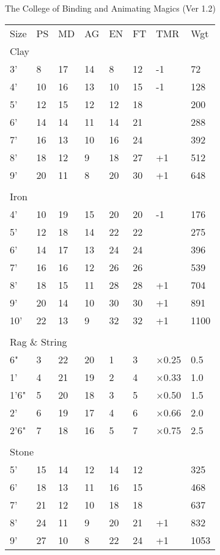 \begin{Chapter}{The College of Binding and Animating Magics (Ver 1.2)}
\begin{small}
\begin{tabularx}{\columnwidth}{llllllll}
Size	& PS	& MD	& AG	& EN	& FT	& TMR	& Wgt \\
\multicolumn{8}{l}{Clay} \\
3’	& 8	& 17	& 14	& 8	& 12	& -1	& 72 \\
4’	& 10	& 16	& 13	& 10	& 15	& -1	& 128 \\
5’	& 12	& 15	& 12	& 12	& 18	& 	& 200 \\
6’	& 14	& 14	& 11	& 14	& 21	& 	& 288 \\
7’	& 16	& 13	& 10	& 16	& 24	& 	& 392 \\
8’	& 18	& 12	& 9	& 18	& 27	& +1	& 512 \\
9’	& 20	& 11	& 8	& 20	& 30	& +1	& 648 \\
 	& 	& 	& 	& 	& 	& 	& \\
\multicolumn{8}{l}{Iron} \\
4’ 	& 10	& 19	& 15	& 20	& 20	& -1	& 176 \\
5’ 	& 12	& 18	& 14	& 22	& 22	& 	& 275 \\
6’ 	& 14	& 17	& 13	& 24	& 24	& 	& 396 \\
7’ 	& 16	& 16	& 12	& 26	& 26	& 	& 539 \\
8’ 	& 18	& 15	& 11	& 28	& 28	& +1	& 704 \\
9’ 	& 20	& 14	& 10	& 30	& 30	& +1	& 891 \\
10’ 	& 22	& 13	& 9	& 32	& 32	& +1	& 1100 \\
 	& 	& 	& 	& 	& 	& 	& \\
\multicolumn{8}{l}{Rag \& String} \\
6"	& 3	& 22	& 20	& 1	& 3	& ×0.25	& 0.5 \\
1’ 	& 4	& 21	& 19	& 2	& 4	& ×0.33	& 1.0 \\
1’6" 	& 5	& 20	& 18	& 3	& 5	& ×0.50	& 1.5 \\
2’ 	& 6	& 19	& 17	& 4	& 6	& ×0.66	& 2.0 \\
2’6" 	& 7	& 18	& 16	& 5	& 7	& ×0.75	& 2.5 \\
 	& 	& 	& 	& 	& 	& 	& \\
\multicolumn{8}{l}{Stone} \\
5’ 	& 15	& 14	& 12	& 14	& 12	& 	& 325 \\
6’ 	& 18	& 13	& 11	& 16	& 15	& 	& 468 \\
7’ 	& 21	& 12	& 10	& 18	& 18	& 	& 637 \\
8’ 	& 24	& 11	& 9	& 20	& 21	& +1	& 832 \\
9’ 	& 27	& 10	& 8	& 22	& 24	& +1	& 1053 \\

\end{tabularx}
\end{small}
\end{Chapter}
